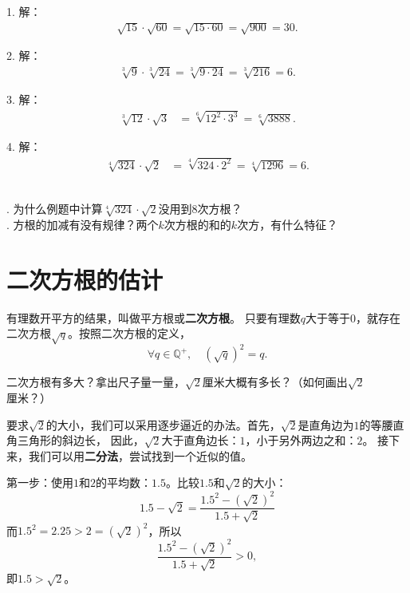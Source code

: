 \documentclass[12pt,UTF8]{ctexbook}
\begin{document}
\begin{so}
    1. 解： 
    \begin{align*}
        \sqrt{15}\cdot\sqrt{60} = \sqrt{15\cdot 60} = \sqrt{900} = 30. 
    \end{align*}

    2. 解：
    \begin{align*}
        \sqrt[3]{9}\cdot\sqrt[3]{24} = \sqrt[3]{9\cdot 24} = \sqrt[3]{216} = 6. 
    \end{align*}

    3. 解：
    \begin{align*}
        \sqrt[3]{12}\cdot\sqrt{3} &= \sqrt[6]{12^2\cdot 3^3} = \sqrt[6]{3888}. 
    \end{align*}

    4. 解：
    \begin{align*}
        \sqrt[4]{324}\cdot\sqrt{2} &= \sqrt[4]{324\cdot 2^2} = \sqrt[4]{1296} = 6. 
    \end{align*}
           
\end{so}

\begin{sk}
    \mbox{}\\
    . 为什么例题中计算$\sqrt[4]{324}\cdot\sqrt{2}$没用到$8$次方根？\\
    . 方根的加减有没有规律？两个$k$次方根的和的$k$次方，有什么特征？
\end{sk}

\section{二次方根的估计}
有理数开平方的结果，叫做平方根或\textbf{二次方根}。
只要有理数$q$大于等于$0$，就存在二次方根$\sqrt{q}$。按照二次方根的定义，
$$\forall q\in\mathbb{Q}^+, \quad \left(\sqrt{q}\right)^2 = q.$$

二次方根有多大？拿出尺子量一量，$\sqrt{2}$厘米大概有多长？（如何画出$\sqrt{2}$厘米？）

要求$\sqrt{2}$的大小，我们可以采用逐步逼近的办法。首先，$\sqrt{2}$是直角边为$1$的等腰直角三角形的斜边长，
因此，$\sqrt{2}$大于直角边长：$1$，小于另外两边之和：$2$。
接下来，我们可以用\textbf{二分法}，尝试找到一个近似的值。

第一步：使用$1$和$2$的平均数：$1.5$。比较$1.5$和$\sqrt{2}$的大小：
$$ 1.5 - \sqrt{2} = \frac{1.5^2 - \left(\sqrt{2}\right)^2}{1.5 + \sqrt{2}} $$
而$1.5^2 = 2.25 > 2 = \left(\sqrt{2}\right)^2$，所以
$$ \frac{1.5^2 - \left(\sqrt{2}\right)^2}{1.5 + \sqrt{2}} > 0,$$
即$1.5 > \sqrt{2}$。
\end{document}
